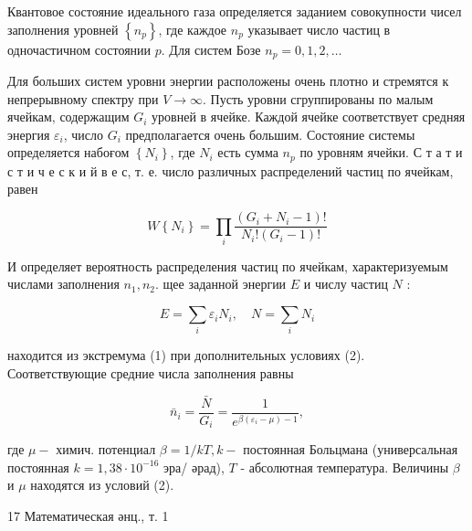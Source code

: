 \documentclass[10pt]{article}
\begin{document}
Квантовое состояние идеального газа определяется заданием совокупности чисел заполнения уровней $\left\{n_{p}\right\}$, где каждое $n_{p}$ указывает число частиц в одночастичном состоянии $p$. Для систем Бозе $n_{p}=0,1,2, \ldots$



Для больших систем уровни энергии расположены очень плотно и стремятся к непрерывному спектру при $V \rightarrow \infty$. Пусть уровни сгруппированы по малым ячейкам, содержащим $G_{i}$ уровней в ячейке. Каждой ячейке соответствует средняя энергия $\varepsilon_{i}$, число $G_{i}$ предполагается очень большим. Состояние системы определяется набоғом $\left\{N_{i}\right\}$, где $N_{i}$ есть сумма $n_{p}$ по уровням ячейки. С т а т и с т и ч е с к и й в е с, т. е. число различных распределений частиц по ячейкам, равен



\[

W\left\{N_{i}\right\}=\prod_{i} \frac{\left(G_{i}+N_{i}-1\right) !}{N_{i} !\left(G_{i}-1\right) !}

\]



И определяет вероятность распределения частиц по ячейкам, характеризуемым числами заполнения $n_{1}, n_{2}$. щее заданной энергии $E$ и числу частиц $N$ :



\[

E=\sum_{i} \varepsilon_{i} N_{i}, \quad N=\sum_{i} N_{i}

\]



находится из экстремума (1) при дополнительных условиях (2). Соответствующие средние числа заполнения равны



\[

\bar{n}_{i}=\frac{\bar{N}}{G_{i}}=\frac{1}{e^{\beta\left(\varepsilon_{i}-\mu\right)-1}},

\]



где $\mu-$ химич. потенциал $\beta=1 / k T, k-$ постоянная Больцмана (универсальная постоянная $k=1,38 \cdot 10^{-16}$ эра/ әрад), $T$ - абсолютная температура. Величины $\beta$ и $\mu$ находятся из условий (2).



17 Математическая әнц., т. 1
\end{document}
